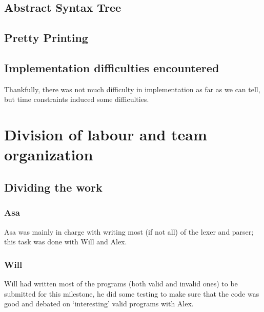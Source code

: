 \documentclass{article}
\begin{document}



\subsection{Abstract Syntax Tree}

\subsection{Pretty Printing}

\subsection{Implementation difficulties encountered}

Thankfully, there was not much difficulty in implementation as far as we can tell, but time constraints induced some difficulties.

\section{Division of labour and team organization}

\subsection{Dividing the work}

\subsubsection{Asa}

Asa was mainly in charge with writing most (if not all) of the lexer and parser; this task was done with Will and Alex.

\subsubsection{Will}


Will had written most of the programs (both valid and invalid ones) to be
submitted for this milestone, he did some testing to make sure that the code was good and debated on `interesting' valid programs with Alex.
\end{document}
